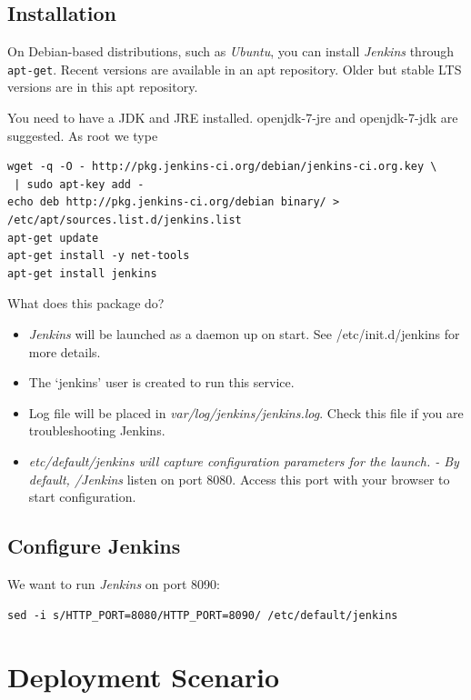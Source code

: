 \documentclass[captions=tableheading]{article}
\begin{document}
\subsection{Installation}
\label{sec-5-1}

On Debian-based distributions, such as \emph{Ubuntu}, you can install \emph{Jenkins} through \texttt{apt-get}. Recent versions are available in an apt repository. Older but stable LTS versions are in this apt repository.

You need to have a JDK and JRE installed. openjdk-7-jre and openjdk-7-jdk are suggested. As root we type

\begin{verbatim}
wget -q -O - http://pkg.jenkins-ci.org/debian/jenkins-ci.org.key \
 | sudo apt-key add - 
echo deb http://pkg.jenkins-ci.org/debian binary/ >  /etc/apt/sources.list.d/jenkins.list
apt-get update
apt-get install -y net-tools
apt-get install jenkins
\end{verbatim}

What does this package do?
\begin{itemize}
\item \emph{Jenkins} will be launched as a daemon up on start. See /etc/init.d/jenkins for more details.
\item The `jenkins' user is created to run this service.
\item Log file will be placed in \emph{var/log/jenkins/jenkins.log}. Check this file if you are troubleshooting Jenkins.
\item \emph{etc/default/jenkins will capture configuration parameters for the launch. - By default, /Jenkins} listen on port 8080. Access this port with your browser to start configuration.
\end{itemize}
\subsection{Configure Jenkins}
\label{sec-5-2}

We want to run \emph{Jenkins} on port 8090: 

\begin{verbatim}
sed -i s/HTTP_PORT=8080/HTTP_PORT=8090/ /etc/default/jenkins
\end{verbatim}
\section{Deployment Scenario}
\label{sec-6}
\end{document}
